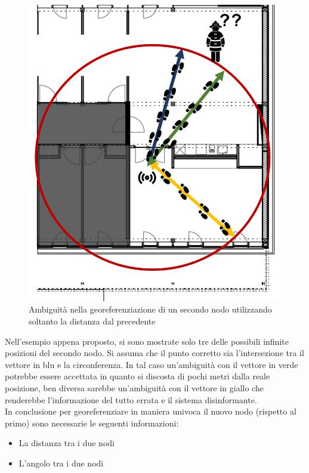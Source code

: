 \begin{figure}[H]
	\centering
	\includegraphics[scale=0.35]{DescrizioneDelSistema/ambiguitDistanza.png}
	\caption{Ambiguità nella georeferenziazione di un secondo nodo utilizzando soltanto la distanza dal precedente }
	\label{fig:ambiguitDistanz}
\end{figure}
Nell'esempio appena proposto, si sono mostrate solo tre delle possibili infinite posizioni del secondo nodo. Si assuma che il punto corretto sia l'intersezione tra il vettore in blu e la circonferenza. In tal caso un'ambiguità con il vettore in verde potrebbe essere accettata in quanto si discosta di pochi metri dalla reale posizione, ben diversa sarebbe un'ambiguità con il vettore in giallo che renderebbe l'informazione del tutto errata e il sistema disinformante.\\
In conclusione per georeferenziare in maniera univoca il nuovo nodo (rispetto al primo) sono necessarie le seguenti informazioni:
\begin{itemize}
	\item La distanza tra i due nodi
	\item L'angolo tra i due nodi
\end{itemize} 
